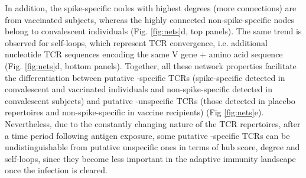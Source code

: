 In addition, the spike-specific nodes with highest degrees (more connections) are from vaccinated subjects, whereas the highly connected non-spike-specific nodes belong to convalescent individuals (Fig. \ref{fig:nets}d, top panels). The same trend is observed for self-loops, which represent TCR convergence, i.e. additional nucleotide TCR sequences encoding the same V gene + amino acid sequence (Fig. \ref{fig:nets}d, bottom panels). Together, all these network properties facilitate the differentiation between putative \covid-specific TCRs (spike-specific detected in convalescent and vaccinated individuals and non-spike-specific detected in convalescent subjects) and putative \covid-unspecific TCRs (those detected in placebo repertoires and non-spike-specific in vaccine recipients) (Fig \ref{fig:nets}e). Nevertheless, due to the constantly changing nature of the TCR repertoires, after a time period following antigen exposure, some putative \covid-specific TCRs can be undistinguishable from putative unspecific ones in terms of hub score, degree and self-loops, since they become less important in the adaptive immunity landscape once the infection is cleared.



